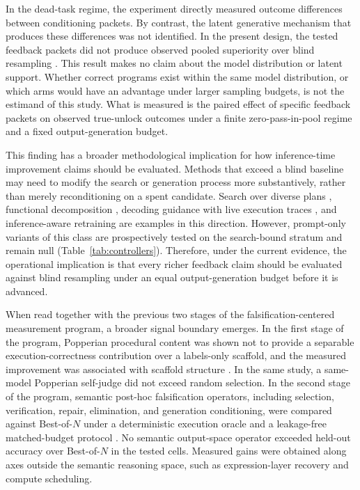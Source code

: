 \documentclass{article}
\numberwithin{equation}{section}  %
\theoremstyle{definition}
\begin{document}
In the dead-task regime, the experiment directly measured outcome differences between
conditioning packets. By contrast, the latent generative mechanism that produces these
differences was not identified. In the present design, the tested feedback packets did not
produce observed pooled superiority over blind resampling
\citep{brown2024monkeys,snell2024testtime}. This result makes no claim about the model
distribution or latent support. Whether correct programs exist within the same model
distribution, or which arms would have an advantage under larger sampling budgets, is not the
estimand of this study. What is measured is the paired effect of specific feedback packets on
observed true-unlock outcomes under a finite zero-pass-in-pool regime and a fixed
output-generation budget.

This finding has a broader methodological implication for how inference-time improvement
claims should be evaluated. Methods that exceed a blind baseline may need to modify the search
or generation process more substantively, rather than merely reconditioning on a spent
candidate. Search over diverse plans \citep{wang2025plansearch}, functional decomposition
\citep{chen2024funcoder}, decoding guidance with live execution traces
\citep{lavon2025egcfg}, and inference-aware retraining \citep{chow2025inferenceaware} are
examples in this direction. However, prompt-only variants of this class are prospectively
tested on the search-bound stratum and remain null (Table~\ref{tab:controllers}).
Therefore, under the current evidence, the operational implication is that every richer
feedback claim should be evaluated against blind resampling under an equal output-generation
budget before it is advanced.

When read together with the previous two stages of the falsification-centered measurement
program, a broader signal boundary emerges. In the first stage of the program, Popperian
procedural content was shown not to provide a separable execution-correctness contribution
over a labels-only scaffold, and the measured improvement was associated with scaffold
structure \citep{iscan2026scaffold}. In the same study, a same-model Popperian self-judge did
not exceed random selection. In the second stage of the program, semantic post-hoc
falsification operators, including selection, verification, repair, elimination, and
generation conditioning, were compared against Best-of-$N$ under a deterministic execution
oracle and a leakage-free matched-budget protocol \citep{iscan2026selection}. No semantic
output-space operator exceeded held-out accuracy over Best-of-$N$ in the tested cells.
Measured gains were obtained along axes outside the semantic reasoning space, such as
expression-layer recovery and compute scheduling.
\end{document}
